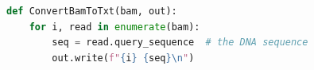 \begin{lstlisting}[language=Python, caption={Bam to Txt Conversion}, label={lst:python-bam-to-txt}]    
def ConvertBamToTxt(bam, out):
    for i, read in enumerate(bam):
        seq = read.query_sequence  # the DNA sequence
        out.write(f"{i} {seq}\n")
\end{lstlisting}